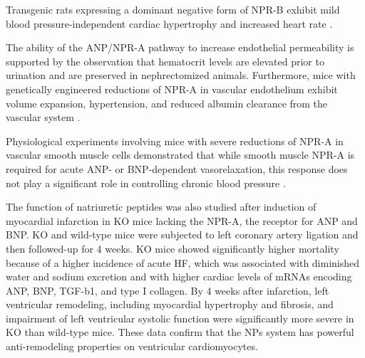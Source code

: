 \documentclass[14pt,a4paper,onecolumn]{extarticle}
\begin{document}

Transgenic rats expressing a dominant negative form of NPR-B exhibit mild blood pressure-independent cardiac hypertrophy and increased heart rate \citep{Langenickel2006}. %

The ability of the ANP/NPR-A pathway to increase  endothelial permeability is supported by the observation that hematocrit levels are elevated prior to urination and are preserved in nephrectomized animals.  Furthermore, mice with genetically engineered reductions of NPR-A in vascular endothelium exhibit volume expansion, hypertension, and reduced albumin clearance from the vascular system \citep{Sabrane2005}. %

Physiological experiments involving mice with severe reductions of NPR-A in vascular smooth muscle cells demonstrated that while smooth muscle NPR-A is required for acute ANP- or BNP-dependent vasorelaxation, this response does not play a significant role in controlling chronic blood pressure \citep{Holtwick2002}. %


The function of natriuretic peptides was also studied after induction of myocardial infarction in KO mice lacking the NPR-A, the receptor for ANP and BNP. KO and wild-type mice were subjected to left coronary artery ligation and then followed-up for 4 weeks. KO mice showed significantly higher mortality because of a higher incidence of acute HF, which was associated with diminished water and sodium excretion and with higher cardiac levels of mRNAs encoding ANP, BNP, TGF-b1, and type I collagen. By 4 weeks after infarction, left ventricular remodeling, including myocardial hypertrophy and fibrosis, and impairment of left ventricular systolic function were significantly more severe in KO than wild-type mice. These data confirm that the NPs system has powerful anti-remodeling properties on ventricular cardiomyocytes.\citep{89} %
\end{document}
